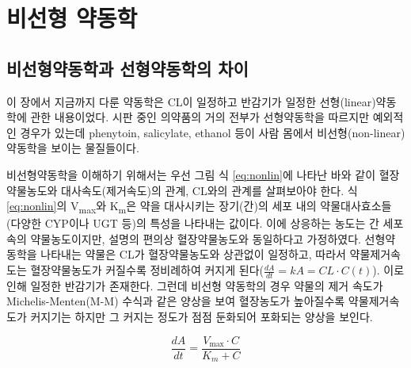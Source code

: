 \documentclass[
  11pt,
  krantz2, a4paper, twoside]{krantz}
\theoremstyle{definition}
\theoremstyle{definition}
\theoremstyle{definition}
\theoremstyle{definition}
\theoremstyle{remark}
\begin{document}
\hypertarget{uxbe44uxc120uxd615-uxc57duxb3d9uxd559}{%
\section{\texorpdfstring{비선형 약동학}{비선형 약동학}}\label{uxbe44uxc120uxd615-uxc57duxb3d9uxd559}}

\hypertarget{uxbe44uxc120uxd615uxc57duxb3d9uxd559uxacfc-uxc120uxd615uxc57duxb3d9uxd559uxc758-uxcc28uxc774}{%
\subsection{\texorpdfstring{비선형약동학과 선형약동학의 차이}{비선형약동학과 선형약동학의 차이}}\label{uxbe44uxc120uxd615uxc57duxb3d9uxd559uxacfc-uxc120uxd615uxc57duxb3d9uxd559uxc758-uxcc28uxc774}}

이 장에서 지금까지 다룬 약동학은 CL이 일정하고 반감기가 일정한 선형(linear)약동학에 관한 내용이었다. 
시판 중인 의약품의 거의 전부가 선형약동학을 따르지만 예외적인 경우가 있는데 phenytoin, salicylate, ethanol 등이 사람 몸에서 비선형(non-linear)약동학을 보이는 물질들이다.

비선형약동학을 이해하기 위해서는 우선 그림 식 \eqref{eq:nonlin}에 나타난 바와 같이 혈장 약물농도와 대사속도(제거속도)의 관계, CL와의 관계를 살펴보아야 한다. 
식 \eqref{eq:nonlin}의 V\textsubscript{max}와 K\textsubscript{m}은 약을 대사시키는 장기(간)의 세포 내의 약물대사효소들(다양한 CYP이나 UGT 등)의 특성을 나타내는 값이다.
이에 상응하는 농도는 간 세포 속의 약물농도이지만, 설명의 편의상 혈장약물농도와 동일하다고 가정하였다.
선형약동학을 나타내는 약물은 CL가 혈장약물농도와 상관없이 일정하고, 따라서 약물제거속도는 혈장약물농도가 커질수록 정비례하여 커지게 된다(\(\frac{{dA}}{{dt}} = kA = CL \cdot C(t)\)). 
이로 인해 일정한 반감기가 존재한다. 
그런데 비선형 약동학의 경우 약물의 제거 속도가 Michelis-Menten(M-M) 수식과 같은 양상을 보여 혈장농도가 높아질수록 약물제거속도가 커지기는 하지만 그 커지는 정도가 점점 둔화되어 포화되는 양상을 보인다. 

\begin{equation}
\frac{{dA}}{{dt}} = \frac{V_{\max} \cdot C}{K_{m} + C}
\label{eq:nonlin}
\end{equation}
\end{document}
